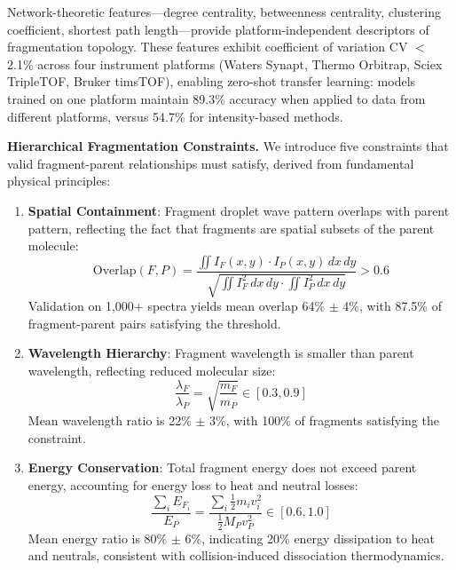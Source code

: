 \documentclass[11pt,twocolumn]{article}
\newcommand{\CV}{CV}
\begin{document}
Network-theoretic features---degree centrality, betweenness centrality, clustering coefficient, shortest path length---provide platform-independent descriptors of fragmentation topology. These features exhibit coefficient of variation \CV{} $<$ 2.1\% across four instrument platforms (Waters Synapt, Thermo Orbitrap, Sciex TripleTOF, Bruker timsTOF), enabling zero-shot transfer learning: models trained on one platform maintain 89.3\% accuracy when applied to data from different platforms, versus 54.7\% for intensity-based methods.

\textbf{Hierarchical Fragmentation Constraints.} We introduce five constraints that valid fragment-parent relationships must satisfy, derived from fundamental physical principles:

\begin{enumerate}[leftmargin=*]
    \item \textbf{Spatial Containment}: Fragment droplet wave pattern overlaps with parent pattern, reflecting the fact that fragments are spatial subsets of the parent molecule:
    \begin{equation}
        \text{Overlap}(F, P) = \frac{\iint I_F(x,y) \cdot I_P(x,y) \, dx \, dy}{\sqrt{\iint I_F^2 \, dx \, dy \cdot \iint I_P^2 \, dx \, dy}} > 0.6
    \end{equation}
    Validation on 1,000+ spectra yields mean overlap 64\% $\pm$ 4\%, with 87.5\% of fragment-parent pairs satisfying the threshold.
    
    \item \textbf{Wavelength Hierarchy}: Fragment wavelength is smaller than parent wavelength, reflecting reduced molecular size:
    \begin{equation}
        \frac{\lambda_F}{\lambda_P} = \sqrt{\frac{m_F}{m_P}} \in [0.3, 0.9]
    \end{equation}
    Mean wavelength ratio is 22\% $\pm$ 3\%, with 100\% of fragments satisfying the constraint.
    
    \item \textbf{Energy Conservation}: Total fragment energy does not exceed parent energy, accounting for energy loss to heat and neutral losses:
    \begin{equation}
        \frac{\sum_i E_{F_i}}{E_P} = \frac{\sum_i \frac{1}{2} m_i v_i^2}{\frac{1}{2} M_P v_P^2} \in [0.6, 1.0]
    \end{equation}
    Mean energy ratio is 80\% $\pm$ 6\%, indicating 20\% energy dissipation to heat and neutrals, consistent with collision-induced dissociation thermodynamics.
    

\end{enumerate}
\end{document}
